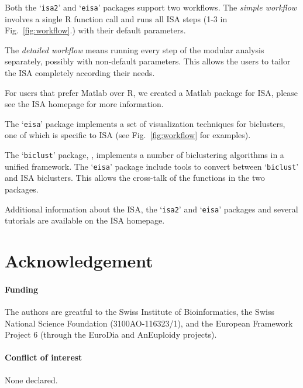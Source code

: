 \documentclass{bioinfo}
\newcommand{\Rpackage}[1]{`\texttt{#1}'}
\begin{document}
Both the \Rpackage{isa2} and \Rpackage{eisa} packages support two
workflows. The \emph{simple workflow} involves a single R function
call and runs all ISA steps (1-3 in Fig.~\ref{fig:workflow}.) with
their default parameters.

The \emph{detailed workflow} means running every step of the modular
analysis separately, possibly with non-default parameters. This allows
the users to tailor the ISA completely according their needs.

For users that prefer Matlab over R, we created a Matlab package for
ISA, please see the ISA homepage for more information.


The \Rpackage{eisa} package implements a set of visualization
techniques for biclusters, one of which is specific to ISA (see
Fig.~\ref{fig:workflow} for examples). 



The \Rpackage{biclust} package, \citep{biclust}, implements a number of
biclustering algorithms in a unified framework. The \Rpackage{eisa}
package include tools to convert between \Rpackage{biclust} and ISA
biclusters. This allows the cross-talk of the functions in the two
packages.

Additional information about the ISA, the \Rpackage{isa2} and
\Rpackage{eisa} packages and several tutorials are available on the
ISA homepage.

\section*{Acknowledgement}

\paragraph{Funding\textcolon} The authors are greatful to the Swiss
Institute of Bioinformatics, the Swiss National Science Foundation
(3100AO-116323/1), and the European Framework Project 6 (through
the EuroDia and AnEuploidy projects).
\paragraph{Conflict of interest\textcolon} None declared.



\end{document}
